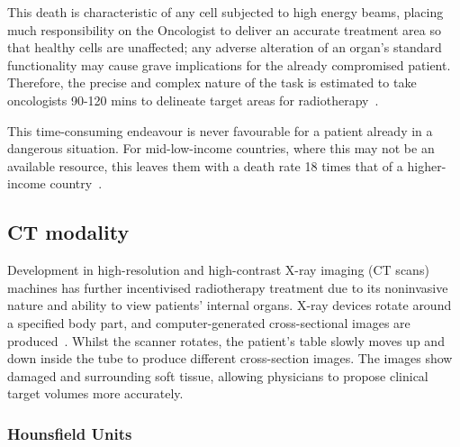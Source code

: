 \documentclass[12pt,twoside]{report}
\begin{document}
This death is characteristic of any cell subjected to high energy beams, placing much responsibility on the Oncologist to deliver an accurate treatment area so that healthy cells are unaffected; any adverse alteration of an organ's standard functionality may cause grave implications for the already compromised patient. Therefore, the precise and complex nature of the task is estimated to take oncologists 90-120 mins to delineate target areas for radiotherapy~\cite{LIU2020184}.

This time-consuming endeavour is never favourable for a patient already in a dangerous situation. For mid-low-income countries, where this may not be an available resource, this leaves them with a death rate 18 times that of a higher-income country~\cite{cervical-cancer-epidemic}. 

\subsection{CT modality}

Development in high-resolution and high-contrast X-ray imaging (CT scans) machines has further incentivised radiotherapy treatment due to its noninvasive nature and ability to view patients' internal organs. X-ray devices rotate around a specified body part, and computer-generated cross-sectional images are produced~\cite{file-formats}. Whilst the scanner rotates, the patient's table slowly moves up and down inside the tube to produce different cross-section images. The images show damaged and surrounding soft tissue, allowing physicians to propose clinical target volumes more accurately.

\subsubsection{Hounsfield Units}
\end{document}
